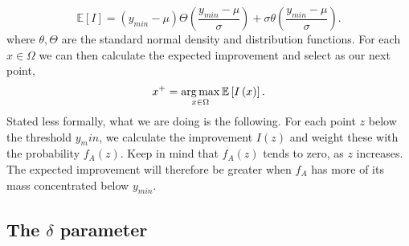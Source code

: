 \[
\mathbb{E}\left[ I \right] = \left( y_{min} - \mu  \right) \Theta\left(\frac{y_{min} - \mu }{\sigma} \right) + \sigma \theta \left( \frac{y_{min} - \mu }{\sigma} \right) 
.\] 
where $\theta, \Theta$ are the standard normal density and distribution functions. For each $x \in  \Omega$ we can then calculate the expected improvement and select as our next point,
\[
x^{+} = \operatorname*{arg\,max}_{x \in \Omega}\mathbb{E}\left[ I\left( x \right)  \right] 
.\] 
Stated less formally, what we are doing is the following. For each point $z$ below the threshold $y_min$, we calculate the improvement $I(z)$ and weight these with the probability $f_A\left( z \right) $. Keep in mind that $f_A(z)$ tends to zero, as  $z$ increases. The expected improvement will therefore be greater when $f_A$ has more of its mass concentrated below $y_{min}$.
\subsection{The $\delta$ parameter}


